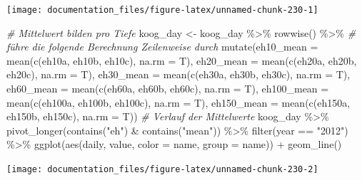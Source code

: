 \documentclass[
]{article}
\newenvironment{Shaded}{\begin{snugshade}}{\end{snugshade}}
\newcommand{\AttributeTok}[1]{\textcolor[rgb]{0.77,0.63,0.00}{#1}}
\newcommand{\CommentTok}[1]{\textcolor[rgb]{0.56,0.35,0.01}{\textit{#1}}}
\newcommand{\FunctionTok}[1]{\textcolor[rgb]{0.00,0.00,0.00}{#1}}
\newcommand{\NormalTok}[1]{#1}
\newcommand{\OtherTok}[1]{\textcolor[rgb]{0.56,0.35,0.01}{#1}}
\newcommand{\SpecialCharTok}[1]{\textcolor[rgb]{0.00,0.00,0.00}{#1}}
\newcommand{\StringTok}[1]{\textcolor[rgb]{0.31,0.60,0.02}{#1}}
\begin{document}
\begin{center}\texttt{[image: documentation\_files/figure-latex/unnamed-chunk-230-1]} \end{center}

\begin{Shaded}
\begin{Highlighting}[]
\CommentTok{\# Mittelwert bilden pro Tiefe}
\NormalTok{koog\_day }\OtherTok{\textless{}{-}}\NormalTok{ koog\_day }\SpecialCharTok{\%\textgreater{}\%}
  \FunctionTok{rowwise}\NormalTok{() }\SpecialCharTok{\%\textgreater{}\%} \CommentTok{\# führe die folgende Berechnung Zeilenweise durch}
  \FunctionTok{mutate}\NormalTok{(}\AttributeTok{eh10\_mean =} \FunctionTok{mean}\NormalTok{(}\FunctionTok{c}\NormalTok{(eh10a, eh10b, eh10c), }\AttributeTok{na.rm =}\NormalTok{ T),}
         \AttributeTok{eh20\_mean =} \FunctionTok{mean}\NormalTok{(}\FunctionTok{c}\NormalTok{(eh20a, eh20b, eh20c), }\AttributeTok{na.rm =}\NormalTok{ T),}
         \AttributeTok{eh30\_mean =} \FunctionTok{mean}\NormalTok{(}\FunctionTok{c}\NormalTok{(eh30a, eh30b, eh30c), }\AttributeTok{na.rm =}\NormalTok{ T),}
         \AttributeTok{eh60\_mean =} \FunctionTok{mean}\NormalTok{(}\FunctionTok{c}\NormalTok{(eh60a, eh60b, eh60c), }\AttributeTok{na.rm =}\NormalTok{ T),}
         \AttributeTok{eh100\_mean =} \FunctionTok{mean}\NormalTok{(}\FunctionTok{c}\NormalTok{(eh100a, eh100b, eh100c), }\AttributeTok{na.rm =}\NormalTok{ T),}
         \AttributeTok{eh150\_mean =} \FunctionTok{mean}\NormalTok{(}\FunctionTok{c}\NormalTok{(eh150a, eh150b, eh150c), }\AttributeTok{na.rm =}\NormalTok{ T))}
\CommentTok{\# Verlauf der Mittelwerte }
\NormalTok{koog\_day }\SpecialCharTok{\%\textgreater{}\%}
  \FunctionTok{pivot\_longer}\NormalTok{(}\FunctionTok{contains}\NormalTok{(}\StringTok{"eh"}\NormalTok{) }\SpecialCharTok{\&} \FunctionTok{contains}\NormalTok{(}\StringTok{"mean"}\NormalTok{)) }\SpecialCharTok{\%\textgreater{}\%}
  \FunctionTok{filter}\NormalTok{(year }\SpecialCharTok{==} \StringTok{"2012"}\NormalTok{) }\SpecialCharTok{\%\textgreater{}\%}
  \FunctionTok{ggplot}\NormalTok{(}\FunctionTok{aes}\NormalTok{(daily, value, }\AttributeTok{color =}\NormalTok{ name, }\AttributeTok{group =}\NormalTok{ name)) }\SpecialCharTok{+}
  \FunctionTok{geom\_line}\NormalTok{()}
\end{Highlighting}
\end{Shaded}

\begin{center}\texttt{[image: documentation\_files/figure-latex/unnamed-chunk-230-2]} \end{center}
\end{document}
